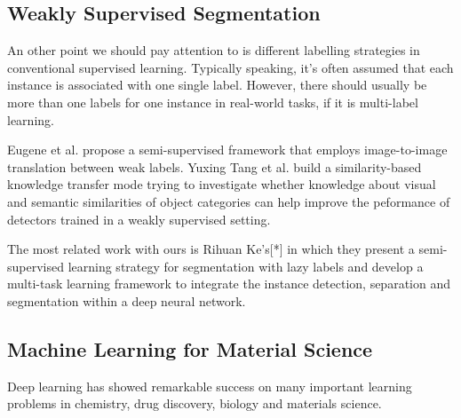 \documentclass[10pt,twocolumn,letterpaper]{article}
\begin{document}
\subsection{Weakly Supervised Segmentation}

An other point we should pay attention to is different labelling strategies in conventional supervised learning.
Typically speaking, it's often assumed that each instance is associated with one single label. However, there should usually be more than one labels for one instance in real-world tasks, if it is multi-label learning.



Eugene et al. propose a semi-supervised framework that employs image-to-image translation between weak labels.
Yuxing Tang et al. build a similarity-based knowledge transfer mode trying to investigate whether knowledge about visual and semantic similarities of object categories can help improve the peformance of detectors trained in a weakly supervised setting.

The most related work with ours is Rihuan Ke's[*] in which they present a semi-supervised learning strategy for segmentation with lazy labels and develop a multi-task learning framework to integrate the instance detection, separation and segmentation within a deep neural network.

\subsection{Machine Learning for Material Science}

Deep learning has showed remarkable success on many important 
learning problems in chemistry, drug discovery, biology and materials science.
\end{document}
